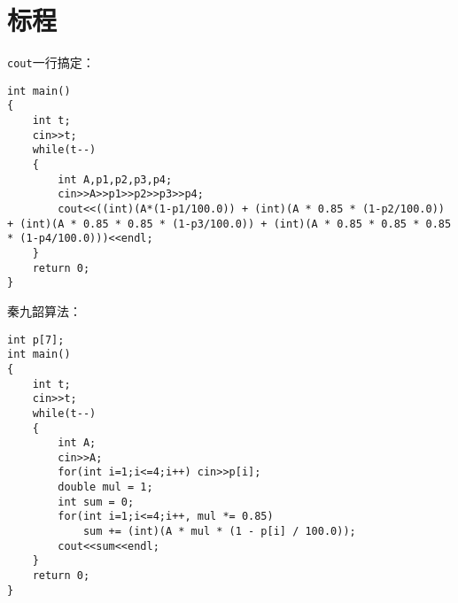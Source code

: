 \documentclass[
	lang=cn,
	color=blue
]{elegantbook}
\begin{document}
\section*{标程}
\lstinline{cout}一行搞定：
\begin{lstlisting}
int main()
{
    int t;
    cin>>t;
    while(t--)
    {
        int A,p1,p2,p3,p4;
        cin>>A>>p1>>p2>>p3>>p4;
        cout<<((int)(A*(1-p1/100.0)) + (int)(A * 0.85 * (1-p2/100.0)) + (int)(A * 0.85 * 0.85 * (1-p3/100.0)) + (int)(A * 0.85 * 0.85 * 0.85 * (1-p4/100.0)))<<endl;
    }
    return 0;
}
\end{lstlisting}

秦九韶算法：
\begin{lstlisting}
int p[7];
int main()
{
    int t;
    cin>>t;
    while(t--)
    {
        int A;
        cin>>A;
        for(int i=1;i<=4;i++) cin>>p[i];
        double mul = 1;
        int sum = 0;
        for(int i=1;i<=4;i++, mul *= 0.85)
            sum += (int)(A * mul * (1 - p[i] / 100.0));
        cout<<sum<<endl;
    }
    return 0;
}
\end{lstlisting}
\end{document}
